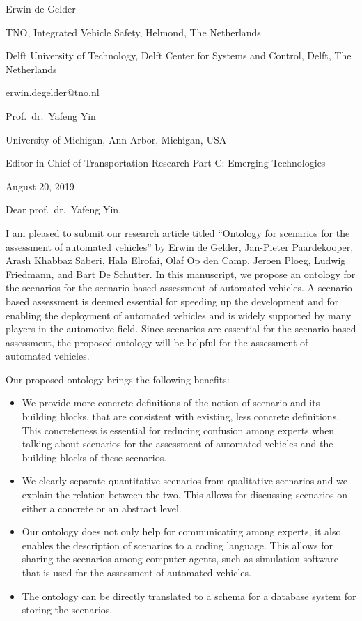 \documentclass{article}
\begin{document}
Erwin de Gelder

TNO, Integrated Vehicle Safety, Helmond, The Netherlands

Delft University of Technology, Delft Center for Systems and Control, Delft, The Netherlands

erwin.degelder@tno.nl

\vspace{1em}

Prof.\ dr.\ Yafeng Yin

University of Michigan, Ann Arbor, Michigan, USA

Editor-in-Chief of Transportation Research Part C: Emerging Technologies

\vspace{1em}

August 20, 2019

\vspace{2em}


Dear prof.\ dr.\ Yafeng Yin,

\vspace{1em}

I am pleased to submit our research article titled “Ontology for scenarios for the assessment of automated vehicles” by Erwin de Gelder, Jan-Pieter Paardekooper, Arash Khabbaz Saberi, Hala Elrofai, Olaf Op den Camp, Jeroen Ploeg, Ludwig Friedmann, and Bart De Schutter. In this manuscript, we propose an ontology for the scenarios for the scenario-based assessment of automated vehicles. A scenario-based assessment is deemed essential for speeding up the development and for enabling the deployment of automated vehicles and is widely supported by many players in the automotive field. Since scenarios are essential for the scenario-based assessment, the proposed ontology will be helpful for the assessment of automated vehicles.

Our proposed ontology brings the following benefits:
\begin{itemize}
	\item We provide more concrete definitions of the notion of scenario and its building blocks, that are consistent with existing, less concrete definitions. This concreteness is essential for reducing confusion among experts when talking about scenarios for the assessment of automated vehicles and the building blocks of these scenarios.
	\item We clearly separate quantitative scenarios from qualitative scenarios and we explain the relation between the two. This allows for discussing scenarios on either a concrete or an abstract level.
	\item Our ontology does not only help for communicating among experts, it also enables the description of scenarios to a coding language. This allows for sharing the scenarios among computer agents, such as simulation software that is used for the assessment of automated vehicles.
	\item The ontology can be directly translated to a schema for a database system for storing the scenarios.
\end{itemize}
\end{document}
